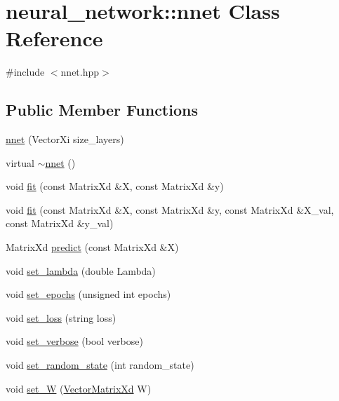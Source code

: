 \hypertarget{classneural__network_1_1nnet}{}\section{neural\+\_\+network\+:\+:nnet Class Reference}
\label{classneural__network_1_1nnet}


{\ttfamily \#include $<$nnet.\+hpp$>$}

\subsection*{Public Member Functions}
\begin{DoxyCompactItemize}
\item 
\hyperlink{classneural__network_1_1nnet_a4e8f24320f7c6c574899c85a92cb382f}{nnet} (Vector\+Xi size\+\_\+layers)
\item 
virtual \hyperlink{classneural__network_1_1nnet_acbb2074dbf2cfc8eda5536f6cbd92875}{$\sim$nnet} ()
\item 
void \hyperlink{classneural__network_1_1nnet_ad994357ff229ee9d3ff518b882565200}{fit} (const Matrix\+Xd \&X, const Matrix\+Xd \&y)
\item 
void \hyperlink{classneural__network_1_1nnet_a2b4f6283bc64d8ee1786c01da8fbc700}{fit} (const Matrix\+Xd \&X, const Matrix\+Xd \&y, const Matrix\+Xd \&X\+\_\+val, const Matrix\+Xd \&y\+\_\+val)
\item 
Matrix\+Xd \hyperlink{classneural__network_1_1nnet_a0e37c0cad47a0f7117b205100e0f42cb}{predict} (const Matrix\+Xd \&X)
\item 
void \hyperlink{classneural__network_1_1nnet_a944d1f4a66e93ff0845937674ae08b5d}{set\+\_\+lambda} (double Lambda)
\item 
void \hyperlink{classneural__network_1_1nnet_afd3120ed7fd3b4d6c3f80a6cedd55359}{set\+\_\+epochs} (unsigned int epochs)
\item 
void \hyperlink{classneural__network_1_1nnet_aa258225543f20ccf89424fa4e16f60b6}{set\+\_\+loss} (string loss)
\item 
void \hyperlink{classneural__network_1_1nnet_a6cd9badbd0718f2fde70c095fa117b83}{set\+\_\+verbose} (bool verbose)
\item 
void \hyperlink{classneural__network_1_1nnet_a120dd243ed0335bd9600f2654c579f8e}{set\+\_\+random\+\_\+state} (int random\+\_\+state)
\item 
void \hyperlink{classneural__network_1_1nnet_aba1c920e1e1580581999d9fcfaa89a3b}{set\+\_\+\+W} (\hyperlink{nnet_8hpp_a4826060b437e399cfd1fca5281109704}{Vector\+Matrix\+Xd} W)

\end{DoxyCompactItemize}
